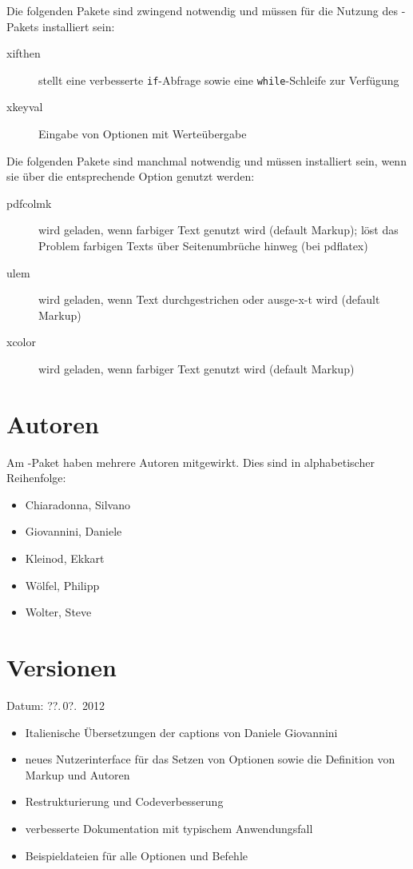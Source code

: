 Die folgenden Pakete sind zwingend notwendig und müssen für die Nutzung des -Pakets installiert sein:
\begin{description}
	\item [xifthen] stellt eine verbesserte \texttt{if}-Abfrage sowie eine \texttt{while}-Schleife zur Verfügung
	\item [xkeyval] Eingabe von Optionen mit Werteübergabe
\end{description}

Die folgenden Pakete sind manchmal notwendig und müssen installiert sein, wenn sie über die entsprechende Option genutzt werden:
\begin{description}
	\item [pdfcolmk] wird geladen, wenn farbiger Text genutzt wird (default Markup); löst das Problem farbigen Texts über Seitenumbrüche hinweg (bei pdflatex)
	\item [ulem] wird geladen, wenn Text durchgestrichen oder ausge-x-t wird (default Markup)
	\item [xcolor] wird geladen, wenn farbiger Text genutzt wird (default Markup)
\end{description}


\section{Autoren}
\label{sec:authors}

Am -Paket haben mehrere Autoren mitgewirkt.
Dies sind in alphabetischer Reihenfolge:
\begin{itemize}
	\item Chiaradonna, Silvano
	\item Giovannini, Daniele
	\item Kleinod, Ekkart
	\item Wölfel, Philipp
	\item Wolter, Steve
\end{itemize}



\section{Versionen}
\label{sec:versions}


Datum: ??.\,0?.~2012
\begin{itemize}
	\item Italienische Übersetzungen der captions von Daniele Giovannini
	\item neues Nutzerinterface für das Setzen von Optionen sowie die Definition von Markup und Autoren
	\item Restrukturierung und Codeverbesserung
	\item verbesserte Dokumentation mit typischem Anwendungsfall
	\item Beispieldateien für alle Optionen und Befehle
\end{itemize}

